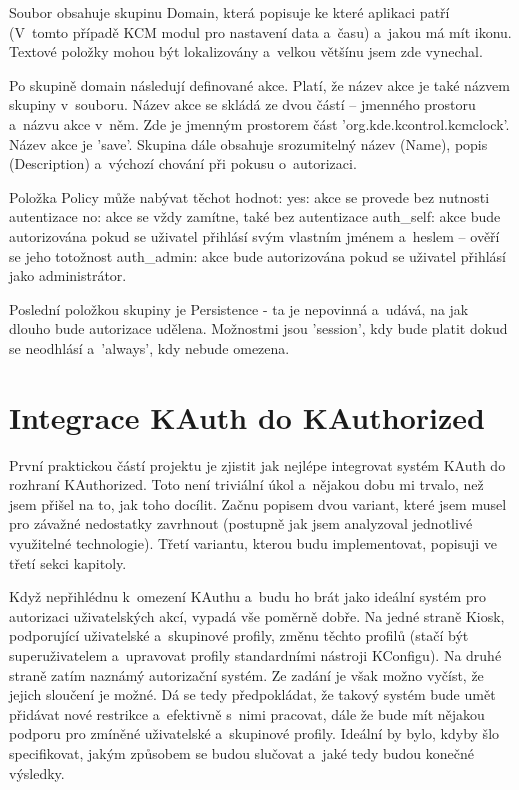 Soubor obsahuje skupinu Domain, která popisuje ke které aplikaci patří (V~tomto
případě KCM modul pro nastavení data a~času) a~jakou má mít ikonu. Textové
položky mohou být lokalizovány a~velkou většínu jsem zde vynechal.

Po skupině domain následují definované akce. Platí, že název akce je také názvem
skupiny v~souboru. Název akce se skládá ze dvou částí -- jmenného prostoru
a~názvu akce v~něm. Zde je jmenným prostorem část 'org.kde.kcontrol.kcmclock'.
Název akce je 'save'. Skupina dále obsahuje srozumitelný název (Name), popis
(Description) a~výchozí chování při pokusu o~autorizaci.

Položka Policy může nabývat těchot hodnot:
yes: akce se provede bez nutnosti autentizace
no: akce se vždy zamítne, také bez autentizace
auth\_self: akce bude autorizována pokud se uživatel přihlásí svým vlastním
jménem a~heslem -- ověří se jeho totožnost
auth\_admin: akce bude autorizována pokud se uživatel přihlásí jako administrátor.

Poslední položkou skupiny je Persistence - ta je nepovinná a~udává, na jak
dlouho bude autorizace udělena. Možnostmi jsou 'session', kdy bude platit dokud
se neodhlásí a~'always', kdy nebude omezena.

\chapter{Integrace KAuth do KAuthorized}
První praktickou částí projektu je zjistit jak nejlépe integrovat systém KAuth
do rozhraní KAuthorized. Toto není triviální úkol a~nějakou dobu mi trvalo, než
jsem přišel na to, jak toho docílit. Začnu popisem dvou variant, které jsem
musel pro závažné nedostatky zavrhnout (postupně jak jsem analyzoval jednotlivé 
využitelné technologie). Třetí variantu, kterou budu implementovat, popisuji
ve třetí sekci kapitoly.

Když nepřihlédnu k~omezení KAuthu a~budu ho brát jako ideální systém pro
autorizaci uživatelských akcí, vypadá vše poměrně dobře.
Na jedné straně Kiosk, podporující uživatelské a~skupinové profily, změnu
těchto profilů (stačí být superuživatelem a~upravovat profily standardními
nástroji KConfigu).
Na druhé straně zatím naznámý autorizační systém. Ze zadání je však možno
vyčíst, že jejich sloučení je možné. Dá se tedy předpokládat, že takový systém
bude umět přidávat nové restrikce a~efektivně s~nimi pracovat, dále že bude mít
nějakou podporu pro zmíněné uživatelské a~skupinové profily. Ideální by bylo,
kdyby šlo specifikovat, jakým způsobem se budou slučovat a~jaké tedy budou
konečné výsledky.


